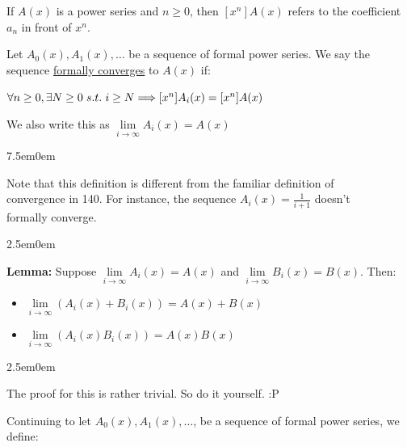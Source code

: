 \documentclass{book}
\newcommand{\hTwo}{%
\color{MidnightBlue}%
   \fontsize{13}{15}\selectfont%
}
\newcommand{\hThree}{%
   \color{PineGreen!85!Orange}
   \fontsize{12}{14}\selectfont%
}
\newcommand{\teachComment}{
   \color{Orange}%
   \fontsize{12}{14}\selectfont%
}
\newenvironment{myIndent}{%
   \begin{adjustwidth}{2.5em}{0em}%
}{%
   \end{adjustwidth}%
}
\newenvironment{myTindent}{%
   \begin{adjustwidth}{7.5em}{0em}%
}{%
   \end{adjustwidth}%
}
\newcommand{\udefine}[1]{{%
   \setulcolor{Red}%
   \setul{0.14em}{0.07em}%
   \ul{#1}%
}}
\newcommand{\blab}[1]{\textbf{#1}}
\newcommand{\suchthat}{ \hspace{0.3em}s.t.\hspace{0.3em}}
\newcommand{\retTwo}{\hfill\bigbreak}
\begin{document}
If $A(x)$ is a power series and $n \geq 0$, then $[x^n]A(x)$ refers to the coefficient $a_n$ in front of $x^n$.\retTwo

Let $A_0(x), A_1(x), \ldots$ be a sequence of formal power series. We say the sequence \udefine{formally converges} to $A(x)$ if:

{\centering $\forall n \geq 0, \exists N \geq 0 \suchthat i \geq N \Longrightarrow [x^n]A_i(x) = [x^n]A(x)$ \retTwo\par}

We also write this as $\lim\limits_{i \rightarrow \infty}A_i(x) = A(x)$

\begin{myTindent}\teachComment
   Note that this definition is different from the familiar definition of\\ convergence in 140. For instance, the sequence $A_i(x) = \frac{1}{i + 1}$ doesn't\\ formally converge.\retTwo
\end{myTindent}

\begin{myIndent}\hTwo
   \blab{Lemma:} Suppose $\lim\limits_{i \rightarrow \infty} A_i(x) = A(x)$ and $\lim\limits_{i \rightarrow \infty} B_i(x) = B(x)$. Then:
   \begin{itemize}
      \item $\lim\limits_{i \rightarrow \infty} (A_i(x) + B_i(x)) = A(x) + B(x)$
      \item $\lim\limits_{i \rightarrow \infty} (A_i(x)B_i(x)) = A(x)B(x)$
   \end{itemize}
   \begin{myIndent}\hThree
      The proof for this is rather trivial. So do it yourself. :P\retTwo
   \end{myIndent}
\end{myIndent}

Continuing to let $A_0(x), A_1(x), \ldots$, be a sequence of formal power series, we define:
\end{document}
